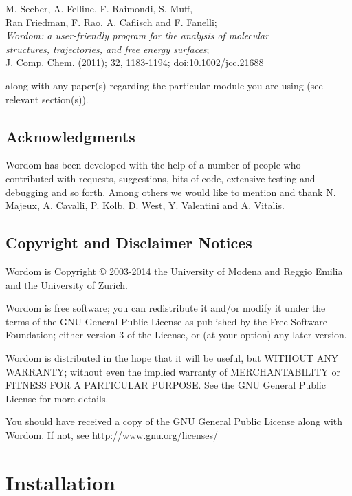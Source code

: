 \documentclass[11pt,twoside,onecolumn,a4paper,openright,notitlepage]{book}[2001/04/21]
\begin{document}
\begin{center}
M. Seeber, A. Felline, F. Raimondi, S. Muff, \\Ran Friedman, F. Rao, A. Caflisch and F. Fanelli; \\
\emph{ Wordom: a user-friendly program for the analysis of molecular\\structures, trajectories, and free energy surfaces};\\
 J. Comp. Chem. (2011); 32, 1183-1194; doi:10.1002/jcc.21688
\end{center}

along with any paper(s) regarding the particular module you are using (see relevant section(s)).

\section{Acknowledgments}
Wordom has been developed with the help of a number of people who contributed with requests, suggestions, bits of code, extensive testing and debugging and so forth. Among others we would like to mention and thank N. Majeux, A. Cavalli, P. Kolb, D. West, Y. Valentini and A. Vitalis.

\section{Copyright and Disclaimer Notices}
Wordom is Copyright \copyright{} 2003-2014 the University of Modena and Reggio Emilia and the University of Zurich.


Wordom is free software; you can redistribute it and/or modify
it under the terms of the GNU General Public License as published by
the Free Software Foundation; either version 3 of the License, or
(at your option) any later version.

Wordom is distributed in the hope that it will be useful,
but WITHOUT ANY WARRANTY; without even the implied warranty of
MERCHANTABILITY or FITNESS FOR A PARTICULAR PURPOSE.  See the
GNU General Public License for more details.

You should have received a copy of the GNU General Public License
along with Wordom.  If not, see \url{http://www.gnu.org/licenses/}


\chapter{Installation}
\end{document}
